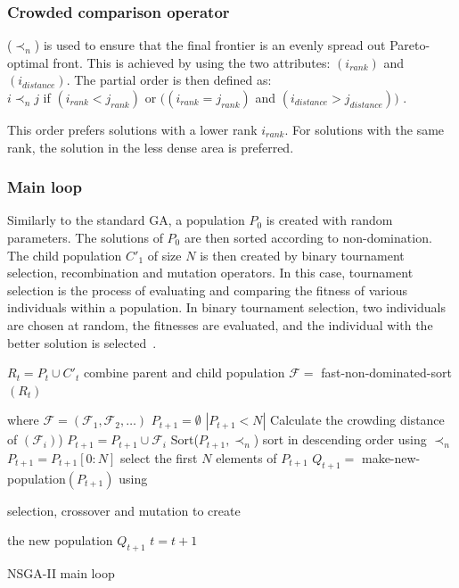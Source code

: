 \subsubsection{Crowded comparison operator}
($\prec_n$) is used to ensure that the final frontier is an evenly spread out Pareto-optimal front. This is achieved by using the two attributes: $(i_{rank})$ and$(i_{distance})$. 
The partial order is then defined as:\\    
$i\prec_nj$ if $(i_{rank}<j_{rank})$ or $((i_{rank}=j_{rank})$ and  $(i_{distance}>j_{distance}))$ \cite{Valkanas2014}.

This order prefers solutions with a lower rank $i_{rank}$. For solutions with the same rank, the solution in the less dense area is preferred.

\subsubsection{Main loop}

Similarly to the standard GA, a population $P_{0}$ is created with random parameters. The solutions of $P_0$ are then sorted according to non-domination. The child population $C'_{1}$ of size $N$ is then created by binary tournament selection, recombination and mutation operators. In this case, tournament selection is the process of evaluating and comparing the fitness of various individuals within a population. In binary tournament selection, two individuals are chosen at random, the fitnesses are evaluated, and the individual with the better solution is selected~\cite{AbdRahman2016}. 



\begin{algorithm}[b]
	\begin{algorithmic}[1]
		\State $R_t=P_t \cup C'_t$ combine parent and child population
		\State $\mathcal{F} = $ fast-non-dominated-sort $(R_t)$ 
		
		where $\mathcal{F}=(\mathcal{F}_1, \mathcal{F}_2,\ldots)$
		\State $P_{t+1}=\emptyset$
		\While $\left|P_{t+1}<N\right|$
		\State Calculate the crowding distance of $(\mathcal{F}_i)$)
		\State $P_{t+1}=P_{t+1}\cup \mathcal{F}_i$
		\EndWhile
		\State Sort($P_{t+1}, \prec_n$) sort in descending order using $\prec_n$
		\State $P_{t+1} = P_{t+1}[0:N]$ select the first $N$ elements of $P_{t+1}$
		\State $Q_{t+1} = $ make-new-population$(P_{t+1})$ using 
		
		selection, crossover and mutation to create 
		
		the new population $Q_{t+1}$
		\State $t=t+1$
		\caption{NSGA-II main loop \cite{Valkanas2014}}
		\label{algo:nsga2}
	\end{algorithmic}
\end{algorithm}


